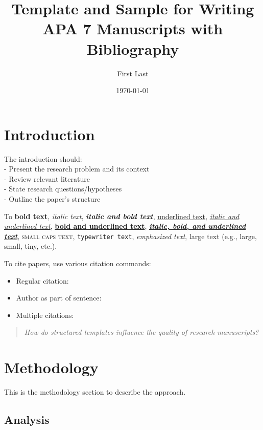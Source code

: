 \documentclass[stu,12pt,floatsintext]{apa7}
\title{\Large{Template and Sample for Writing APA 7 Manuscripts with Bibliography}}
\author{First Last}
\affiliation{Department name \\ Organization name}
\date{\today}  %
\begin{document}
\maketitle

\section{Introduction}
The introduction should:
\\- Present the research problem and its context
\\- Review relevant literature
\\- State research questions/hypotheses
\\- Outline the paper's structure



To \textbf{bold text}, \textit{italic text}, \textbf{\textit{italic and bold text}}, 
\underline{underlined text}, \underline{\textit{italic and underlined text}}, 
\underline{\textbf{bold and underlined text}}, 
\underline{\textbf{\textit{italic, bold, and underlined text}}}, \textsc{small caps text}, \texttt{typewriter text}, 
\emph{emphasized text}, {\Large large text} (e.g., large, small, tiny, etc.).


To cite papers, use various citation commands:
\begin{itemize}
    \item Regular citation: \cite{mujtaba2023frc}
    \item Author as part of sentence: \citet{mujtaba2024ff}
    \item Multiple citations: \citep{mujtaba2023frc, mujtaba2024ff}
\end{itemize}

\begin{quote}
\textit{How do structured templates influence the quality of research manuscripts?}
\end{quote}

\section{Methodology}
This is the methodology section to describe the approach.

\subsection{Analysis}
\end{document}
